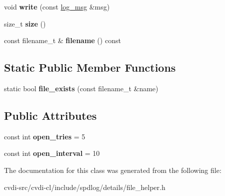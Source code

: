 \begin{DoxyCompactItemize}
\item 
void {\bfseries write} (const \hyperlink{structspdlog_1_1details_1_1log__msg}{log\+\_\+msg} \&msg)\hypertarget{classspdlog_1_1details_1_1file__helper_ab86646bf59fce30003bdfedfb29768ae}{}\label{classspdlog_1_1details_1_1file__helper_ab86646bf59fce30003bdfedfb29768ae}

\item 
size\+\_\+t {\bfseries size} ()\hypertarget{classspdlog_1_1details_1_1file__helper_ad573302cd522df3ae16459625a982e12}{}\label{classspdlog_1_1details_1_1file__helper_ad573302cd522df3ae16459625a982e12}

\item 
const filename\+\_\+t \& {\bfseries filename} () const \hypertarget{classspdlog_1_1details_1_1file__helper_a3cd06d6cc27e18111ff27702d0aeee5e}{}\label{classspdlog_1_1details_1_1file__helper_a3cd06d6cc27e18111ff27702d0aeee5e}

\end{DoxyCompactItemize}
\subsection*{Static Public Member Functions}
\begin{DoxyCompactItemize}
\item 
static bool {\bfseries file\+\_\+exists} (const filename\+\_\+t \&name)\hypertarget{classspdlog_1_1details_1_1file__helper_a822cb4876d3021921acd4151e4e7e585}{}\label{classspdlog_1_1details_1_1file__helper_a822cb4876d3021921acd4151e4e7e585}

\end{DoxyCompactItemize}
\subsection*{Public Attributes}
\begin{DoxyCompactItemize}
\item 
const int {\bfseries open\+\_\+tries} = 5\hypertarget{classspdlog_1_1details_1_1file__helper_a22be952a421d866566eed3a5ce201144}{}\label{classspdlog_1_1details_1_1file__helper_a22be952a421d866566eed3a5ce201144}

\item 
const int {\bfseries open\+\_\+interval} = 10\hypertarget{classspdlog_1_1details_1_1file__helper_aea72ea8d655bb11f19dbe48477e6c8b3}{}\label{classspdlog_1_1details_1_1file__helper_aea72ea8d655bb11f19dbe48477e6c8b3}

\end{DoxyCompactItemize}


The documentation for this class was generated from the following file\+:\begin{DoxyCompactItemize}
\item 
cvdi-\/src/cvdi-\/cl/include/spdlog/details/file\+\_\+helper.\+h\end{DoxyCompactItemize}
